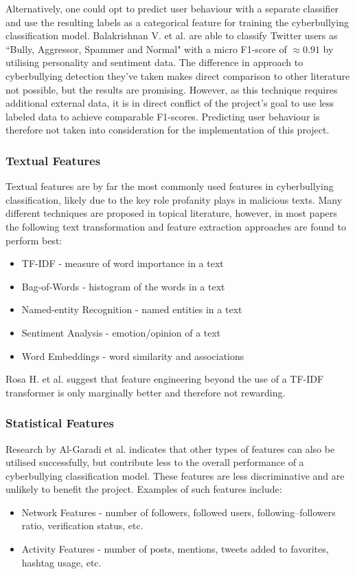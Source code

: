 \documentclass[a4paper,12pt]{article}
\begin{document}
Alternatively, one could opt to predict user behaviour with a separate classifier and use the resulting labels as a categorical feature for training the cyberbullying classification model. Balakrishnan V. et al. \cite{Balakrishnan2020} are able to classify Twitter users as ``Bully, Aggressor, Spammer and Normal" with a micro F1-score of $\approx0.91$ by utilising personality and sentiment data. The difference in approach to cyberbullying detection they've taken makes direct comparison to other literature not possible, but the results are promising. However, as this technique requires additional external data, it is in direct conflict of the project's goal to use less labeled data to achieve comparable F1-scores. Predicting user behaviour is therefore not taken into consideration for the implementation of this project.
\subsubsection{Textual Features}
\label{section:textfeatures}
Textual features are by far the most commonly used features in cyberbullying classification, likely due to the key role profanity plays in malicious texts.
Many different techniques are proposed in topical literature, however, in most papers the following text transformation and feature extraction approaches are found to perform best:
\begin{itemize}
    \item TF-IDF - measure of word importance in a text
    \item Bag-of-Words - histogram of the words in a text
    \item Named-entity Recognition - named entities in a text
    \item Sentiment Analysis - emotion/opinion of a text
    \item Word Embeddings - word similarity and associations
\end{itemize}
Rosa H. et al. \cite{Rosa2019} suggest that feature engineering beyond the use of a TF-IDF transformer is only marginally better and therefore not rewarding.
\subsubsection{Statistical Features}
Research by Al-Garadi et al. \cite{garadi-highestf/top10features} indicates that other types of features can also be utilised successfully, but contribute less to the overall performance of a cyberbullying classification model. These features are less discriminative and are unlikely to benefit the project. Examples of such features include:
\begin{itemize}
    \item Network Features - number of followers, followed users, following–followers ratio, verification status, etc.
    \item Activity Features - number of posts, mentions, tweets added to favorites, hashtag usage, etc.
\end{itemize}
\end{document}
